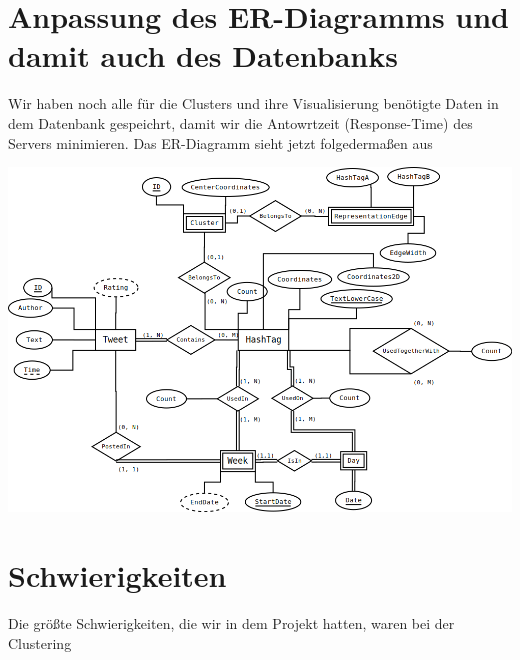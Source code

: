 \section*{Anpassung des ER-Diagramms und damit auch des Datenbanks}

Wir haben noch alle für die Clusters und ihre Visualisierung benötigte Daten in dem Datenbank gespeichrt, damit wir die Antowrtzeit (Response-Time) des Servers minimieren. Das ER-Diagramm sieht jetzt folgedermaßen aus

\includegraphics[width=\textwidth]{../ER-Diagramms/ERDiagramm_v2.png}

\section*{Schwierigkeiten}

Die größte Schwierigkeiten, die wir in dem Projekt hatten, waren bei der Clustering

